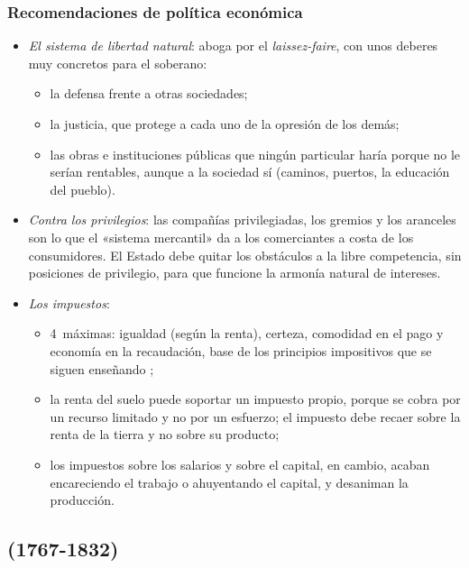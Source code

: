 \documentclass[11pt]{article}
\begin{document}
\subsubsection{Recomendaciones de política económica}\label{sec:smith-politica}

\begin{itemize}
\item \emph{El sistema de libertad natural}:  aboga por el \emph{laissez-faire}, con unos deberes muy concretos para el soberano\nocite{Smith1776Wealth}:
  \begin{itemize}
  \item la defensa frente a otras sociedades;
  \item la justicia, que protege a cada uno de la opresión de los demás;
  \item las obras e instituciones públicas que ningún particular haría porque no le serían rentables, aunque a la sociedad sí (caminos, puertos, la educación del pueblo).
  \end{itemize}
\item \emph{Contra los privilegios}: las compañías privilegiadas, los gremios y los aranceles son lo que el «sistema mercantil» da a los comerciantes a costa de los consumidores. El Estado debe quitar los obstáculos a la libre competencia, sin posiciones de privilegio, para que funcione la armonía natural de intereses.
\item \emph{Los impuestos}:
  \begin{itemize}
  \item 4~máximas: igualdad (según la renta), certeza, comodidad en el pago y economía en la recaudación\nocite{Smith1776Wealth}, base de los principios impositivos que se siguen enseñando ;
  \item la renta del suelo puede soportar un impuesto propio, porque se cobra por un recurso limitado y no por un esfuerzo; el impuesto debe recaer sobre la renta de la tierra y no sobre su producto;
  \item los impuestos sobre los salarios y sobre el capital, en cambio, acaban encareciendo el trabajo o ahuyentando el capital, y desaniman la producción.
  \end{itemize}
\end{itemize}

\subsection{ (1767-1832)}\label{sec:say}
\end{document}
